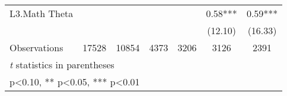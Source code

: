 \begin{sidewaystable}[htbp]
\begin{tabular}{l*{6}{c}}
L3.Math Theta   &            &            &            &            &     0.58***&     0.59***\\
                &            &            &            &            &  (12.10)   &  (16.33)   \\
\midrule
Observations    &    17528   &    10854   &     4373   &     3206   &     3126   &     2391   \\
\bottomrule
\multicolumn{7}{l}{\footnotesize \textit{t} statistics in parentheses}\\
\multicolumn{7}{l}{\footnotesize * p<0.10, ** p<0.05, *** p<0.01}\\
\end{tabular}
\end{sidewaystable}
